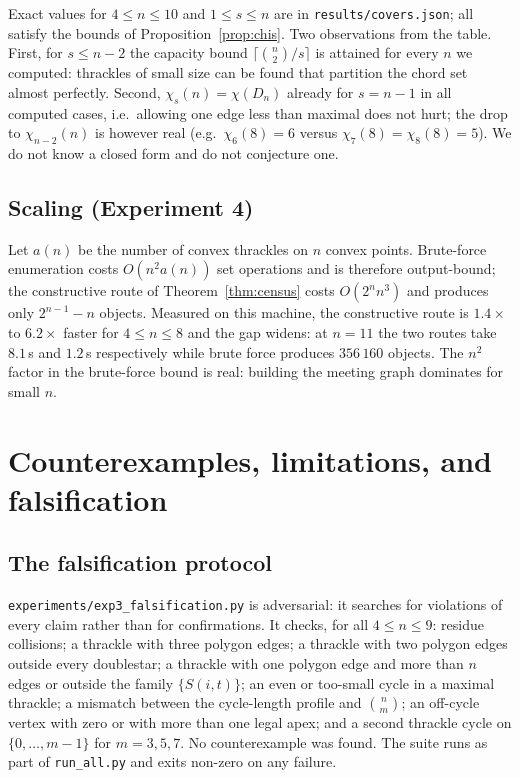\documentclass[11pt,a4paper]{article}
\theoremstyle{definition}
\theoremstyle{plain}
\begin{document}
Exact values for $4\le n\le10$ and $1\le s\le n$ are in
\texttt{results/covers.json}; all satisfy the bounds of
Proposition~\ref{prop:chis}.  Two observations from the table.  First, for
$s\le n-2$ the capacity bound $\lceil\binom n2/s\rceil$ is attained for every
$n$ we computed: thrackles of small size can be found that partition the chord
set almost perfectly.  Second, $\chi_s(n)=\chi(D_n)$ already for $s=n-1$ in all
computed cases, i.e.\ allowing one edge less than maximal does not hurt; the
drop to $\chi_{n-2}(n)$ is however real (e.g.\ $\chi_6(8)=6$ versus
$\chi_7(8)=\chi_8(8)=5$).  We do not know a closed form and do not conjecture
one.

\subsection{Scaling (Experiment 4)}

Let $a(n)$ be the number of convex thrackles on $n$ convex points.
Brute-force enumeration costs $O(n^2 a(n))$ set operations and is therefore
output-bound; the constructive route of Theorem~\ref{thm:census} costs
$O(2^n n^3)$ and produces only $2^{n-1}-n$ objects.  Measured on this machine,
the constructive route is $1.4\times$ to $6.2\times$ faster for $4\le n\le8$
and the gap widens: at $n=11$ the two routes take $8.1$\,s and $1.2$\,s
respectively while brute force produces $356\,160$ objects.  The $n^2$ factor in
the brute-force bound is real: building the meeting graph dominates for small
$n$.

\section{Counterexamples, limitations, and falsification}

\subsection{The falsification protocol}

\texttt{experiments/exp3\_falsification.py} is adversarial: it searches for
violations of every claim rather than for confirmations.  It checks, for all
$4\le n\le9$: residue collisions; a thrackle with three polygon edges; a
thrackle with two polygon edges outside every doublestar; a thrackle with one
polygon edge and more than $n$ edges or outside the family $\{S(i,t)\}$; an
even or too-small cycle in a maximal thrackle; a mismatch between the
cycle-length profile and $\binom nm$; an off-cycle vertex with zero or with more
than one legal apex; and a second thrackle cycle on $\{0,\dots,m-1\}$ for
$m=3,5,7$.  No counterexample was found.  The suite runs as part of
\texttt{run\_all.py} and exits non-zero on any failure.
\end{document}
